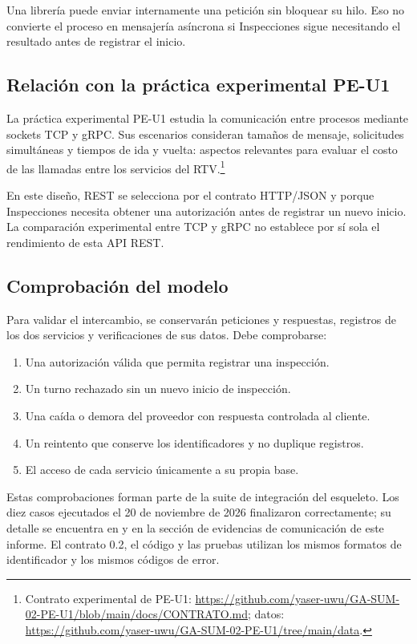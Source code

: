 \documentclass[11pt,a4paper]{article}
\begin{document}
	Una librería puede enviar internamente una petición sin bloquear su hilo. Eso no convierte el proceso en mensajería asíncrona si Inspecciones sigue necesitando el resultado antes de registrar el inicio.
	
	\subsection{Relación con la práctica experimental PE-U1}
	
	La práctica experimental PE-U1 estudia la comunicación entre procesos mediante sockets TCP y gRPC. Sus escenarios consideran tamaños de mensaje, solicitudes simultáneas y tiempos de ida y vuelta: aspectos relevantes para evaluar el costo de las llamadas entre los servicios del RTV.\footnote{Contrato experimental de PE-U1: \url{https://github.com/yaser-uwu/GA-SUM-02-PE-U1/blob/main/docs/CONTRATO.md}; datos: \url{https://github.com/yaser-uwu/GA-SUM-02-PE-U1/tree/main/data}.}
	
	En este diseño, REST se selecciona por el contrato HTTP/JSON y porque Inspecciones necesita obtener una autorización antes de registrar un nuevo inicio. La comparación experimental entre TCP y gRPC no establece por sí sola el rendimiento de esta API REST.
	
	\subsection{Comprobación del modelo}
	
	Para validar el intercambio, se conservarán peticiones y respuestas, registros de los dos servicios y verificaciones de sus datos. Debe comprobarse:
	
	\begin{enumerate}[nosep]
		\item Una autorización válida que permita registrar una inspección.
		\item Un turno rechazado sin un nuevo inicio de inspección.
		\item Una caída o demora del proveedor con respuesta controlada al cliente.
		\item Un reintento que conserve los identificadores y no duplique registros.
		\item El acceso de cada servicio únicamente a su propia base.
	\end{enumerate}
	
	Estas comprobaciones forman parte de la suite de integración del esqueleto. Los diez casos ejecutados el 20 de noviembre de 2026 finalizaron correctamente; su detalle se encuentra en  y en la sección de evidencias de comunicación de este informe. El contrato 0.2, el código y las pruebas utilizan los mismos formatos de identificador y los mismos códigos de error.
	
\end{document}
